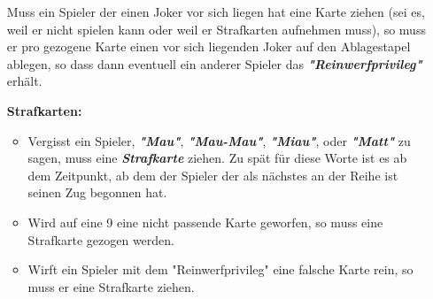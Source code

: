 \documentclass{article}
\begin{document}
\begin{itemize}
Muss ein Spieler der einen Joker vor sich liegen hat eine Karte ziehen (sei es, weil er nicht spielen kann oder weil er Strafkarten aufnehmen muss), so muss er pro gezogene Karte einen vor sich liegenden Joker auf den Ablagestapel ablegen, so dass dann eventuell ein anderer Spieler das \textit{\textbf{"Reinwerfprivileg"}} erhält.
\item[\textbf{Strafkarten:}]
\begin{itemize}
\item Vergisst ein Spieler, \textit{\textbf{"Mau"}}, \textit{\textbf{"Mau-Mau"}}, \textit{\textbf{"Miau"}}, oder 
\textit{\textbf{"Matt"}} zu sagen, muss eine \textit{\textbf{Strafkarte}} ziehen. Zu spät für diese Worte ist es ab dem Zeitpunkt, ab dem der Spieler der als nächstes an der Reihe ist seinen Zug begonnen hat.


\item Wird auf eine 9 eine nicht passende Karte geworfen, so muss eine Strafkarte gezogen werden.

\item Wirft ein Spieler mit dem "Reinwerfprivileg" eine falsche Karte rein, so muss er eine Strafkarte ziehen.
\end{itemize}         
\end{itemize}
          
\end{document}
